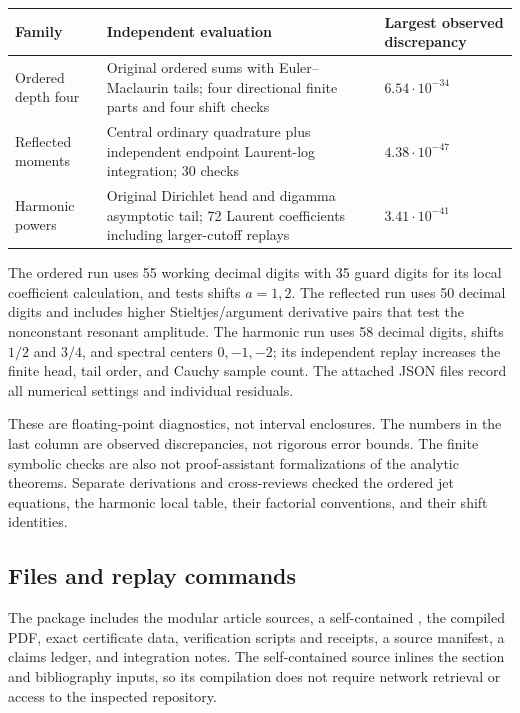 \begin{center}
\begin{tabular}{@{}p{}p{}p{}@{}}
\toprule
Family & Independent evaluation & Largest observed discrepancy\\
\midrule
Ordered depth four & Original ordered sums with Euler--Maclaurin tails;
four directional finite parts and four shift checks &
$6.54\cdot10^{-34}$\\[5pt]
Reflected moments & Central ordinary quadrature plus independent
endpoint Laurent-log integration; 30 checks &
$4.38\cdot10^{-47}$\\[5pt]
Harmonic powers & Original Dirichlet head and digamma asymptotic tail;
72 Laurent coefficients including larger-cutoff replays &
$3.41\cdot10^{-41}$\\
\bottomrule
\end{tabular}
\end{center}

The ordered run uses 55 working decimal digits with 35 guard digits
for its local coefficient calculation, and tests shifts $a=1,2$.
The reflected run uses 50 decimal digits and includes higher
Stieltjes/argument derivative pairs that test the nonconstant resonant
amplitude. The harmonic run uses 58 decimal digits, shifts $1/2$ and
$3/4$, and spectral centers $0,-1,-2$; its independent replay increases
the finite head, tail order, and Cauchy sample count. The attached JSON
files record all numerical settings and individual residuals.

These are floating-point diagnostics, not interval enclosures. The
numbers in the last column are observed discrepancies, not rigorous
error bounds. The finite symbolic checks are also not proof-assistant
formalizations of the analytic theorems. Separate derivations and
cross-reviews checked the ordered jet equations, the harmonic local
table, their factorial conventions, and their shift identities.

\subsection{Files and replay commands}

The package includes the modular article sources, a self-contained
, the compiled PDF, exact certificate
data, verification scripts and receipts, a source manifest, a claims
ledger, and integration notes. The self-contained source inlines the
section and bibliography inputs, so its compilation does not require
network retrieval or access to the inspected repository.

